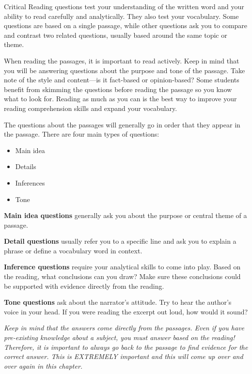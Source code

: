 \documentclass[12pt]{book}
\begin{document}
\bigskip
Critical Reading questions test your understanding of the written word and your ability to read carefully and analytically.  They also test your vocabulary.  Some questions are based on a single passage, while other questions ask you to compare and contrast two related questions, usually based around the same topic or theme.

\bigskip
When reading the passages, it is important to read actively.  Keep in mind that you will be answering questions about the purpose and tone of the passage.  Take note of the style and content—is it fact-based or opinion-based?  Some students benefit from skimming the questions before reading the passage so you know what to look for. Reading as much as you can is the best way to improve your reading comprehension skills and expand your vocabulary.

\bigskip
The questions about the passages will generally go in order that they appear in the passage. There are four main types of questions:

\begin{itemize}
\item Main idea
\item Details
\item Inferences
\item Tone
\end{itemize}

\bigskip
\textbf{Main idea questions} generally ask you about the purpose or central theme of a passage.

\bigskip
\textbf{Detail questions} usually refer you to a specific line and ask you to explain a phrase or define a vocabulary word in context.

\bigskip
\textbf{Inference questions} require your analytical skills to come into play.  Based on the reading, what conclusions can you draw?  Make sure these conclusions could be supported with evidence directly from the reading.

\bigskip
\textbf{Tone questions} ask about the narrator's attitude.  Try to hear the author's voice in your head.  If you were reading the excerpt out loud, how would it sound? 

\bigskip
\textit{Keep in mind that the answers come directly from the passages.  Even if you have pre-existing knowledge about a subject, you must answer based on the reading! Therefore, it is important to always go back to the passage to find evidence for the correct answer. This is EXTREMELY important and this will come up over and over again in this chapter.}
\end{document}
